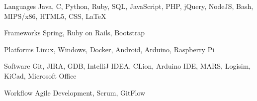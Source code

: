 
\vspace{0mm}
\begin{cvskills}

  \vspace{1mm}

  \cvskill
    {Languages} %
    {Java, C, Python, Ruby, SQL, JavaScript, PHP, jQuery, NodeJS, Bash, MIPS/x86, HTML5, CSS, LaTeX} %

  \vspace{1mm}

  \cvskill
    {Frameworks} %
    {Spring, Ruby on Rails, Bootstrap} %

  \vspace{1mm}

  \cvskill
    {Platforms} %
    {Linux, Windows, Docker, Android, Arduino, Raspberry Pi} %

  \vspace{1mm}

  \cvskill
    {Software} %
    {Git, JIRA, GDB, IntelliJ IDEA, CLion, Arduino IDE, MARS, Logisim, KiCad, Microsoft Office} %

  \cvskill
    {Workflow} %
    {Agile Development, Scrum, GitFlow} %

\end{cvskills}
